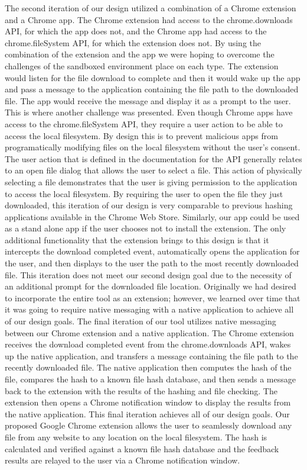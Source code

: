 \documentclass[letterpaper,twocolumn,10pt]{article}
\begin{document}
The second iteration of our design utilized a combination of a Chrome extension and a Chrome app. The Chrome extension had access to the chrome.downloads API, for which the app does not, and the Chrome app had access to the chrome.fileSystem API, for which the extension does not. By using the combination of the extension and the app we were hoping to overcome the challenges of the sandboxed environment place on each type. The extension would listen for the file download to complete and then it would wake up the app and pass a message to the application containing the file path to the downloaded file. The app would receive the message and display it as a prompt to the user. This is where another challenge was presented. Even though Chrome apps have access to the chrome.fileSystem API, they require a user action to be able to access the local filesystem. By design this is to prevent malicious apps from programatically modifying files on the local filesystem without the user’s consent. The user action that is defined in the documentation for the API generally relates to an open file dialog that allows the user to select a file. This action of physically selecting a file demonstrates that the user is giving permission to the application to access the local filesystem. By requiring the user to open the file they just downloaded, this iteration of our design is very comparable to previous hashing applications available in the Chrome Web Store. Similarly, our app could be used as a stand alone app if the user chooses not to install the extension. The only additional functionality that the extension brings to this design is that it intercepts the download completed event, automatically opens the application for the user, and then displays to the user the path to the most recently downloaded file. This iteration does not meet our second design goal due to the necessity of an additional prompt for the downloaded file location. Originally we had desired to incorporate the entire tool as an extension; however, we learned over time that it was going to require native messaging with a native application to achieve all of our design goals.
The final iteration of our tool utilizes native messaging between our Chrome extension and a native application. The Chrome extension receives the download completed event from the chrome.downloads API, wakes up the native application, and transfers a message containing the file path to the recently downloaded file. The native application then computes the hash of the file, compares the hash to a known file hash database, and then sends a message back to the extension with the results of the hashing and file checking. The extension then opens a Chrome notification window to display the results from the native application. This final iteration achieves all of our design goals. Our proposed Google Chrome extension allows the user to seamlessly download any file from any website to any location on the local filesystem. The hash is calculated and verified against a known file hash database and the feedback results are relayed to the user via a Chrome notification window.
\end{document}

